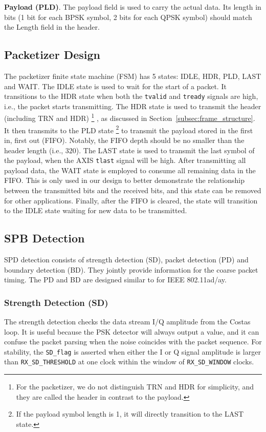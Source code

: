 \documentclass[journal,twoside]{IEEEtran}
\begin{document}
    \textbf{Payload (PLD)}.
    The payload field is used to carry the actual data.
    Its length in bits (1 bit for each BPSK symbol, 2 bits for each QPSK symbol) should match the Length field in the header.

    \subsection{Packetizer Design}

      The packetizer finite state machine (FSM) has 5 states: IDLE, HDR, PLD, LAST and WAIT.
      The IDLE state is used to wait for the start of a packet.
      It transitions to the HDR state when both the \texttt{tvalid} and \texttt{tready} signals are high,
      i.e., the packet starts transmitting.
      The HDR state is used to transmit the header (including TRN and HDR)%
      \footnote{For the packetizer, we do not distinguish TRN and HDR for simplicity,
      and they are called the header in contrast to the payload.}%
      , as discussed in Section~\ref{subsec:frame_structure}.
      It then transmits to the PLD state%
      \footnote{If the payload symbol length is 1, it will directly transition to the LAST state.}
      to transmit the payload stored in the first in, first out (FIFO).
      Notably, the FIFO depth should be no smaller than the header length (i.e., $320$).
      The LAST state is used to transmit the last symbol of the payload,
      when the AXIS \texttt{tlast} signal will be high.
      After transmitting all payload data,
      the WAIT state is employed to consume all remaining data in the FIFO.
      This is only used in our design to better demonstrate the relationship between the transmitted bits and the received bits,
      and this state can be removed for other applications.
      Finally, after the FIFO is cleared, the state will transition to the IDLE state waiting for new data to be transmitted.

    \subsection{SPB Detection}

      SPD detection consists of strength detection (SD),
      packet detection (PD) and boundary detection (BD).
      They jointly provide information for the coarse packet timing.
      The PD and BD are designed similar to \cite{lacruz2021real} for IEEE 802.11ad/ay.

      \subsubsection{Strength Detection (SD)}
      The strength detection checks the data stream I/Q amplitude from the Costas loop.
      It is useful because the PSK detector will always output a value,
      and it can confuse the packet parsing when the noise coincides with the packet sequence.
      For stability, the \texttt{SD\_flag} is asserted when
      either the I or Q signal amplitude is larger than \texttt{RX\_SD\_THRESHOLD}
      at one clock within the window of \texttt{RX\_SD\_WINDOW} clocks.
\end{document}
